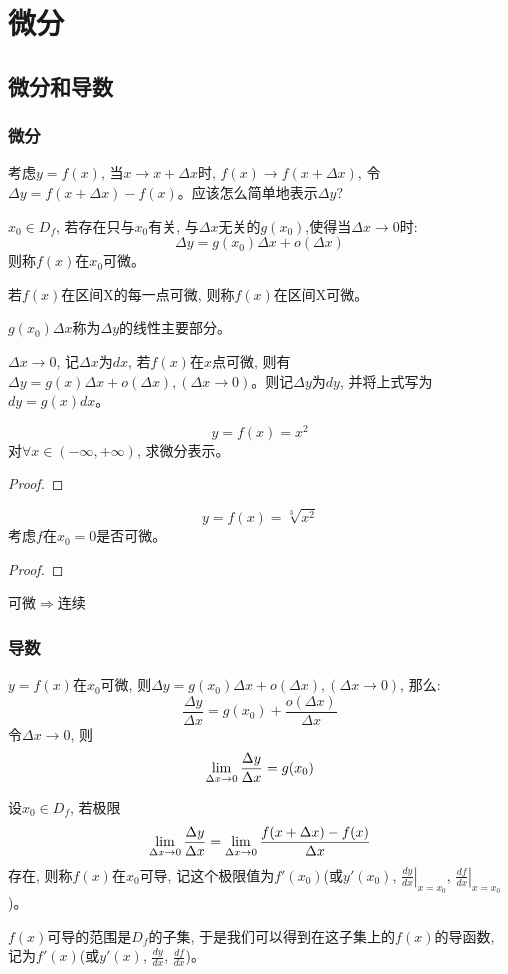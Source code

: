\chapter{微分}
\section{微分和导数}
\subsection{微分}
考虑$y = f(x)$, 当$x \to x + \Delta x$时, $f(x) \to f(x+\Delta x)$, 令$\Delta y = f(x+\Delta x) - f(x)$。应该怎么简单地表示$\Delta y$?
\begin{definition}[微分的定义]
    $x_0 \in D_f$, 若存在只与$x_0$有关, 与$\Delta x$无关的$g(x_0)$,使得当$\Delta x \to 0$时:
    \[ \Delta y = g(x_0)\Delta x + o(\Delta x) \]
    则称$f(x)$在$x_0$可微。

    若$f(x)$在区间X的每一点可微, 则称$f(x)$在区间X可微。

    $g(x_0)\Delta x$称为$\Delta y$的线性主要部分。

    $\Delta x \to 0$, 记$\Delta x$为$dx$, 若$f(x)$在$x$点可微, 则有$\Delta y = g(x)\Delta x + o(\Delta x), (\Delta x \to 0)$。则记$\Delta y$为$dy$, 并将上式写为$dy = g(x)dx $。
\end{definition}

\begin{proposition}
    \[ y = f(x) = x^2 \]
    对$\forall x \in (-\infty, +\infty)$, 求微分表示。
\end{proposition}
\begin{proof}
    
\end{proof}

\begin{proposition}
    \[ y = f(x) = \sqrt[3]{x^2} \]
    考虑$f$在$x_0 = 0$是否可微。
\end{proposition}
\begin{proof}
    
\end{proof}

可微$\Rightarrow$连续
\subsection{导数}
$y = f(x)$在$x_0$可微, 则$\Delta y = g(x_0)\Delta x + o(\Delta x), (\Delta x \to 0)$, 那么:
\[ \frac{\Delta y}{\Delta x} = g(x_0) + \frac{o(\Delta x)}{\Delta x} \]
令$\Delta x \to 0$, 则
\[ \lim_{\Delta x \to 0 } \frac{\Delta y}{\Delta x} = g(x_0)\]
\begin{definition}
    设$x_0 \in D_f$, 若极限
    \[ \lim_{\Delta x \to 0 } \frac{\Delta y}{\Delta x} = \lim_{\Delta x \to 0 } \frac{f(x+\Delta x) - f(x)}{\Delta x} \]
    存在, 则称$f(x)$在$x_0$可导, 记这个极限值为$f'(x_0)$(或$y'(x_0)$, $\left.\frac{dy}{dx}\right|_{x = x_0}$, $\left.\frac{df}{dx}\right|_{x = x_0}$)。
\end{definition}
$f(x)$可导的范围是$D_f$的子集, 于是我们可以得到在这子集上的$f(x)$的导函数, 记为$f'(x)$(或$y'(x)$, $\frac{dy}{dx}$, $\frac{df}{dx}$)。


